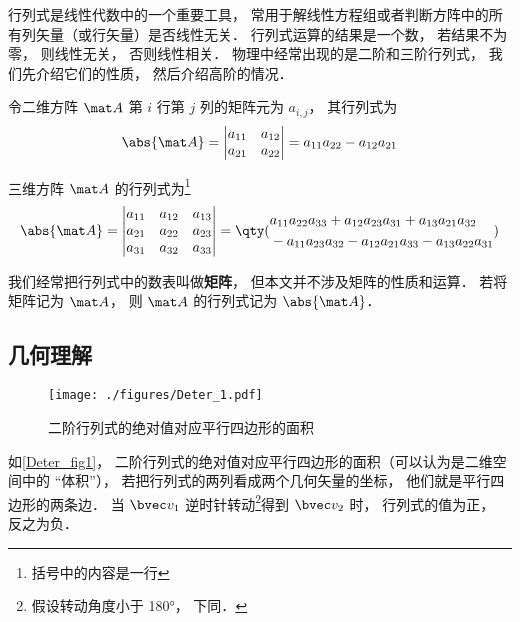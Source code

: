 

行列式是线性代数中的一个重要工具， 常用于解线性方程组或者判断方阵中的所有列矢量（或行矢量）是否线性无关． %
行列式运算的结果是一个数， 若结果不为零， 则线性无关， 否则线性相关． 物理中经常出现的是二阶和三阶行列式， 我们先介绍它们的性质， 然后介绍高阶的情况．

令二维方阵 $\mat A$ 第 $i$ 行第 $j$ 列的矩阵元为 $a_{i,j}$， 其行列式为
\begin{equation}\label{Deter_eq1}
\abs{\mat A} =
\begin{vmatrix}
a_{11} & a_{12} \\
a_{21} & a_{22}
\end{vmatrix} = a_{11}a_{22} - a_{12}a_{21}
\end{equation}

三维方阵 $\mat A$ 的行列式为\footnote{括号中的内容是一行}
\begin{equation}\label{Deter_eq2}
\abs{\mat A} = 
\begin{vmatrix}
a_{11} & a_{12} & a_{13} \\
a_{21} & a_{22} & a_{23} \\
a_{31} & a_{32} & a_{33}
\end{vmatrix}
=
\qty(
\begin{aligned}
&a_{11}a_{22}a_{33} + a_{12}a_{23}a_{31} + a_{13}a_{21}a_{32} \\
&- a_{11}a_{23}a_{32} - a_{12}a_{21}a_{33} - a_{13}a_{22}a_{31}
\end{aligned}
)
\end{equation}

我们经常把行列式中的数表叫做\textbf{矩阵}， 但本文并不涉及矩阵的性质和运算． 若将矩阵记为 $\mat A$， 则 $\mat A$ 的行列式记为 $\abs{\mat A}$．

\subsection{几何理解}

\begin{figure}[ht]
\centering
\texttt{[image: ./figures/Deter\_1.pdf]}
\caption{二阶行列式的绝对值对应平行四边形的面积} \label{Deter_fig1}
\end{figure}
如\autoref{Deter_fig1}， 二阶行列式的绝对值对应平行四边形的面积（可以认为是二维空间中的 “体积”）， 若把行列式的两列看成两个几何矢量的坐标， 他们就是平行四边形的两条边． 当 $\bvec v_1$ 逆时针转动\footnote{假设转动角度小于 180°， 下同．}得到 $\bvec v_2$ 时， 行列式的值为正， 反之为负．

